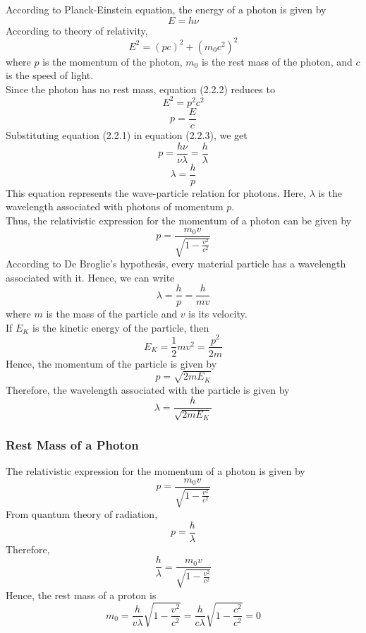 \documentclass[12pt]{article}
\numberwithin{equation}{subsection}
\begin{document}
According to Planck-Einstein equation, the energy of a photon is given by
\begin{equation}
    E = h\nu
\end{equation}
According to theory of relativity,
\begin{equation}
    E^2 = (pc)^2 + (m_0c^2)^2
\end{equation}
where $p$ is the momentum of the photon, $m_0$ is the rest mass of the photon, and $c$ is the speed of light. \\
Since the photon has no rest mass, equation (2.2.2) reduces to \[
    E^2 = p^2c^2
\]
\begin{equation}
    p = \frac{E}{c}
\end{equation}
Substituting equation (2.2.1) in equation (2.2.3), we get \[
    p = \frac{h\nu}{\nu\lambda} = \frac{h}{\lambda}
\]
\begin{equation}
    \boxed{ \lambda = \frac{h}{p} }
\end{equation}
This equation represents the wave-particle relation for photons. Here, $\lambda$ is the wavelength associated with photons of momentum $p$. \\
Thus, the relativistic expression for the momentum of a photon can be given by
\begin{equation}
    \boxed{ p = \frac{m_0v}{\sqrt{1-\frac{v^2}{c^2}}} }
\end{equation}
According to De Broglie's hypothesis, every material particle has a wavelength associated with it. Hence, we can write 
\begin{equation}
    \boxed{ \lambda = \frac{h}{p} = \frac{h}{mv} }
\end{equation}
where $m$ is the mass of the particle and $v$ is its velocity. \\
If $E_K$ is the kinetic energy of the particle, then \[
    E_K = \frac{1}{2}mv^2 = \frac{p^2}{2m}
\]
Hence, the momentum of the particle is given by
\begin{equation}
    \boxed{ p = \sqrt{2mE_K} }
\end{equation}
Therefore, the wavelength associated with the particle is given by
\begin{equation}
    \boxed{ \lambda = \frac{h}{\sqrt{2mE_K}} }
\end{equation}

\subsubsection{Rest Mass of a Photon}
The relativistic expression for the momentum of a photon is given by \[
    p = \frac{m_0v}{\sqrt{1-\frac{v^2}{c^2}}}
\]
From quantum theory of radiation, \[
    p = \frac{h}{\lambda}
\]
Therefore, \[
    \frac{h}{\lambda} = \frac{m_0v}{\sqrt{1-\frac{v^2}{c^2}}}
\]
Hence, the rest mass of a proton is \[
    m_0 = \frac{h}{v\lambda} \sqrt{1-\frac{v^2}{c^2}} = \frac{h}{c\lambda} \sqrt{1 - \frac{c^2}{c^2}} = 0
\]
\end{document}
